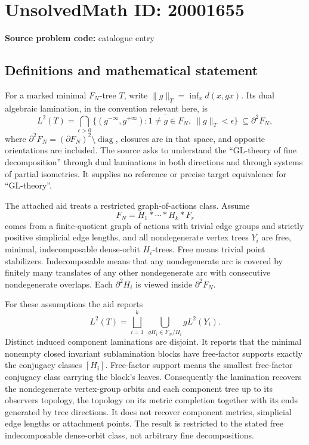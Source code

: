 \documentclass[11pt]{article}
\begin{document}
\section*{UnsolvedMath ID: 20001655}
\textbf{Source problem code:} catalogue entry
\subsection{Definitions and mathematical statement}
For a marked minimal \(F_N\)-tree \(T\), write \(\|g\|_T=\inf_xd(x,gx)\). Its dual algebraic lamination, in the convention relevant here, is
\[
 L^2(T)=\bigcap_{\epsilon>0}\overline{\{(g^{-\infty},g^{+\infty}):1\ne g\in F_N,\ \|g\|_T<\epsilon\}}
 \ \subseteq\partial^2F_N,
\]
where \(\partial^2F_N=(\partial F_N)^2\setminus\operatorname{diag}\), closures are in that space, and opposite orientations are included. The source asks to understand the ``GL-theory of fine decomposition'' through dual laminations in both directions and through systems of partial isometries. It supplies no reference or precise target equivalence for ``GL-theory''.

The attached aid treats a restricted graph-of-actions class. Assume
\[
 F_N=H_1*\cdots*H_k*F_r
\]
comes from a finite-quotient graph of actions with trivial edge groups and strictly positive simplicial edge lengths, and all nondegenerate vertex trees \(Y_i\) are free, minimal, indecomposable dense-orbit \(H_i\)-trees. Free means trivial point stabilizers. Indecomposable means that any nondegenerate arc is covered by finitely many translates of any other nondegenerate arc with consecutive nondegenerate overlaps. Each \(\partial^2H_i\) is viewed inside \(\partial^2F_N\).

For these assumptions the aid reports
\[
 L^2(T)=\bigsqcup_{i=1}^k\ \bigcup_{gH_i\in F_N/H_i}gL^2(Y_i).
\]
Distinct induced component laminations are disjoint. It reports that the minimal nonempty closed invariant sublamination blocks have free-factor supports exactly the conjugacy classes \([H_i]\). Free-factor support means the smallest free-factor conjugacy class carrying the block's leaves. Consequently the lamination recovers the nondegenerate vertex-group orbits and each component tree up to its observers topology, the topology on its metric completion together with its ends generated by tree directions. It does not recover component metrics, simplicial edge lengths or attachment points. The result is restricted to the stated free indecomposable dense-orbit class, not arbitrary fine decompositions.
\end{document}
